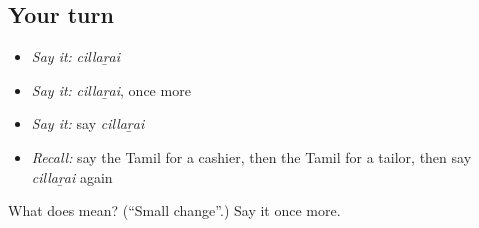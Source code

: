 \subsection*{Your turn}
\begin{itemize}
\raggedright
  \item \emph{Say it:} \emph{cillaṟai}
  \item \emph{Say it:} \emph{cillaṟai}, once more
  \item \emph{Say it:} say \emph{cillaṟai}
  \item \emph{Recall:} say the Tamil for a cashier, then the Tamil for a tailor, then say \emph{cillaṟai} again
\end{itemize}

\begin{tcolorbox}[breakable,colback=teal!4,colframe=teal!35!black,title={Before you move on}]
What does  mean? (\textquotedblleft{}Small change\textquotedblright{}.) Say it once more.
\end{tcolorbox}
